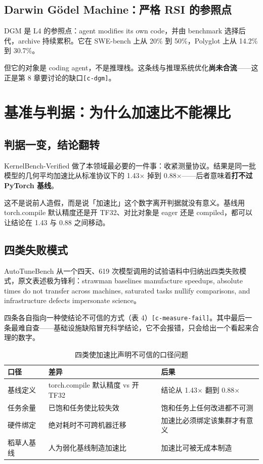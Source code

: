 \subsection{Darwin Gödel Machine：严格 RSI 的参照点}

DGM 是 L4 的参照点：agent modifies its own code，并由 benchmark 选择后代，archive 持续累积。它在 SWE-bench 上从 20\% 到 50\%，Polyglot 上从 14.2\% 到 30.7\%。


但它的对象是 coding agent，不是推理栈。这条线与推理系统优化\textbf{尚未合流}——这正是第 8 章要讨论的缺口{\scriptsize\texttt{[c-\hspace{0pt}dgm]}}。



\section{基准与判据：为什么加速比不能裸比}

\subsection{判据一变，结论翻转}

KernelBench-Verified 做了本领域最必要的一件事：收紧测量协议。结果是同一批模型的几何平均加速比从标准协议下的 1.43× 掉到 0.88×——后者意味着\textbf{打不过 PyTorch 基线}。


这不是说前人造假，而是说「加速比」这个数字离开判据就没有意义。基线用 torch.compile 默认精度还是开 TF32、对比对象是 eager 还是 compiled，都可以让结论在 1.43 与 0.88 之间移动。


\subsection{四类失败模式}

AutoTuneBench 从一个四天、619 次模型调用的试验语料中归纳出四类失败模式，原文表述极为锋利：strawman baselines manufacture speedups, absolute times do not transfer across machines, saturated tasks nullify comparisons, and infrastructure defects impersonate science。


四条各自指向一种使结论不可信的方式（表 4）{\scriptsize\texttt{[c-\hspace{0pt}measure-\hspace{0pt}fail]}}。其中最后一条最难自查——基础设施缺陷冒充科学结论，它不会报错，只会给出一个看起来合理的数字。


\begin{table}[t]
\centering
\footnotesize
\setlength{\tabcolsep}{4pt}
\caption{四类使加速比声明不可信的口径问题}
\label{tab:4}
\begin{tabularx}{\textwidth}{lXl}
\toprule
口径 & 差异 & 后果 \\
\midrule
基线定义 & torch.compile 默认精度 vs 开 TF32 & 结论从 1.43× 翻到 0.88× \\
任务余量 & 已饱和任务使比较失效 & 饱和任务上任何改进都不可测 \\
硬件绑定 & 绝对耗时不可跨机器迁移 & 加速比必须绑定该集群才有意义 \\
稻草人基线 & 人为弱化基线制造加速比 & 加速比可被无成本制造 \\
\bottomrule
\end{tabularx}
\end{table}


